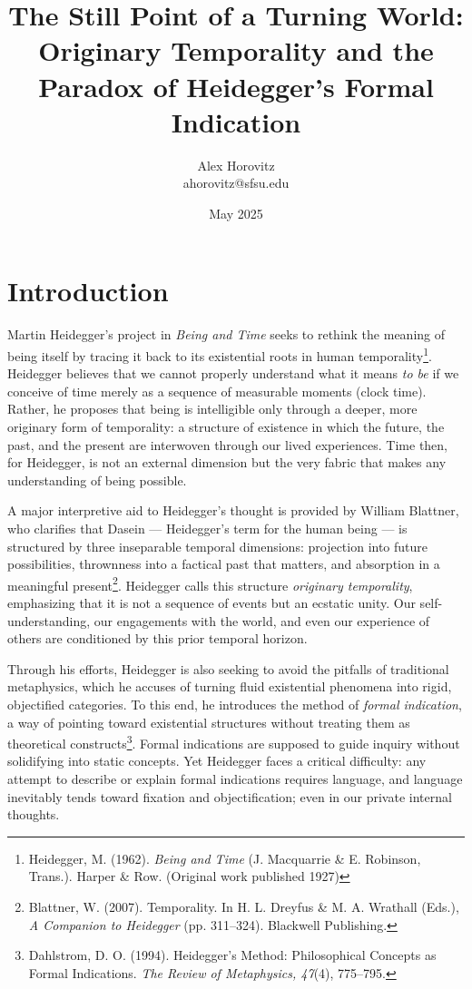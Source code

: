 \documentclass{article}
\title{The Still Point of a Turning World: Originary Temporality and the Paradox of Heidegger's Formal Indication}
\author{Alex Horovitz \\ ahorovitz@sfsu.edu}
\date{May 2025}
\begin{document}
\setlength{\parskip}{0.75em}

\maketitle

\section*{Introduction}

Martin Heidegger's project in \textit{Being and Time} seeks to rethink the meaning of being itself by tracing it back to its existential roots in human temporality\footnote{Heidegger, M. (1962). \textit{Being and Time} (J. Macquarrie \& E. Robinson, Trans.). Harper \& Row. (Original work published 1927)}. Heidegger believes that we cannot properly understand what it means \textit{to be} if we conceive of time merely as a sequence of measurable moments (clock time). Rather, he proposes that being is intelligible only through a deeper, more originary form of temporality: a structure of existence in which the future, the past, and the present are interwoven through our lived experiences. Time then, for Heidegger, is not an external dimension but the very fabric that makes any understanding of being possible.

A major interpretive aid to Heidegger's thought is provided by William Blattner, who clarifies that Dasein --- Heidegger's term for the human being --- is structured by three inseparable temporal dimensions: projection into future possibilities, thrownness into a factical past that matters, and absorption in a meaningful present\footnote{Blattner, W. (2007). Temporality. In H. L. Dreyfus \& M. A. Wrathall (Eds.), \textit{A Companion to Heidegger} (pp. 311--324). Blackwell Publishing.}. Heidegger calls this structure \textit{originary temporality}, emphasizing that it is not a sequence of events but an ecstatic unity. Our self-understanding, our engagements with the world, and even our experience of others are conditioned by this prior temporal horizon.

Through his efforts, Heidegger is also seeking to avoid the pitfalls of traditional metaphysics, which he accuses of turning fluid existential phenomena into rigid, objectified categories. To this end, he introduces the method of \textit{formal indication}, a way of pointing toward existential structures without treating them as theoretical constructs\footnote{Dahlstrom, D. O. (1994). Heidegger's Method: Philosophical Concepts as Formal Indications. \textit{The Review of Metaphysics, 47}(4), 775--795.}. Formal indications are supposed to guide inquiry without solidifying into static concepts. Yet Heidegger faces a critical difficulty: any attempt to describe or explain formal indications requires language, and language inevitably tends toward fixation and objectification; even in our private internal thoughts.
\end{document}
